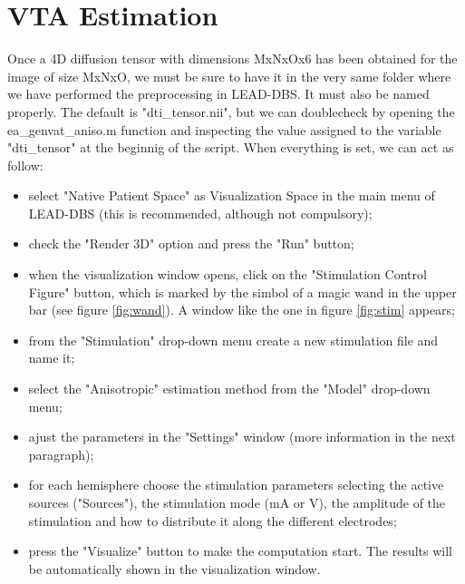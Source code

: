 \documentclass[a4paper,11pt]{article}
\begin{document}


\section{VTA Estimation}

Once a 4D diffusion tensor with dimensions MxNxOx6 has been obtained for the image of size MxNxO, we must be sure to have it in the very same folder where we have performed the preprocessing in LEAD-DBS. It must also be named properly. The default is "dti\_tensor.nii", but we can doublecheck by opening the ea\_genvat\_aniso.m function and inspecting the value assigned to the variable "dti\_tensor" at the beginnig of the script. When everything is set, we can act as follow:

\begin{itemize}
\item select "Native Patient Space" as Visualization Space in the main menu of LEAD-DBS (this is recommended, although not compulsory);
\item check the "Render 3D" option and press the "Run" button;
\item when the visualization window opens, click on the "Stimulation Control Figure" button, which is marked by the simbol of a magic wand in the upper bar (see figure \ref{fig:wand}). A window like the one in figure \ref{fig:stim} appears;
\item from the "Stimulation" drop-down menu create a new stimulation file and name it;
\item select the "Anisotropic" estimation method from the "Model" drop-down menu;
\item ajust the parameters in the "Settings" window (more information in the next paragraph);
\item for each hemisphere choose the stimulation parameters selecting the active sources ("Sources"), the stimulation mode (mA or V), the amplitude of the stimulation and how to distribute it along the different electrodes;
\item press the "Visualize" button to make the computation start. The results will be automatically shown in the visualization window.
\end{itemize}
\end{document}
